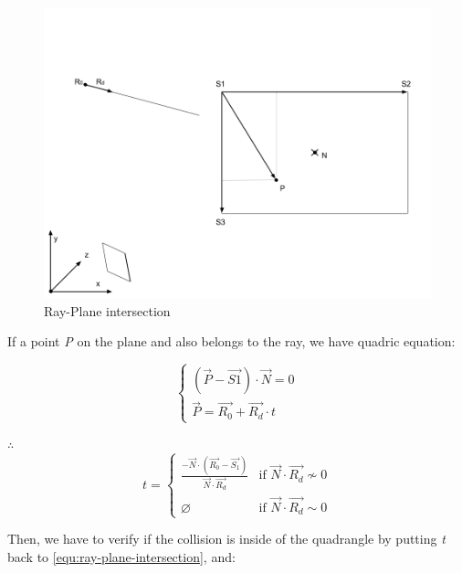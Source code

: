 \begin{figure}[h!]\label{fig:ray-plane}
\centering
\includegraphics[width=\linewidth]{Figures/ray-plane-intersection.png}
\decoRule
\caption[ray-plane-intersection]{Ray-Plane intersection}
\end{figure}

If a point \emph{P} on the plane and also belongs to the ray, we have quadric equation:

\begin{equation}\label{equ:ray-plane-intersection}
\left\{
\begin{array}{lr}
(\overrightarrow{P} - \overrightarrow{S1}) \cdot \overrightarrow{N} = 0 \\
\overrightarrow{P} = \overrightarrow{R_0} + \overrightarrow{R_d} \cdot t
\end{array}
\right.
\end{equation}

$\therefore$
\[
t =
\begin{cases}
\frac{-\overrightarrow{N} \cdot (\overrightarrow{R_0} - \overrightarrow{S_1})}{\overrightarrow{N} \cdot \overrightarrow{R_d}} & \text{if } \overrightarrow{N} \cdot \overrightarrow{R_d} \nsim 0 \\
\varnothing & \text{if } \overrightarrow{N} \cdot \overrightarrow{R_d} \sim 0
\end{cases}
\]

Then, we have to verify if the collision is inside of the quadrangle by putting \emph{t} back to \ref{equ:ray-plane-intersection}, and:



